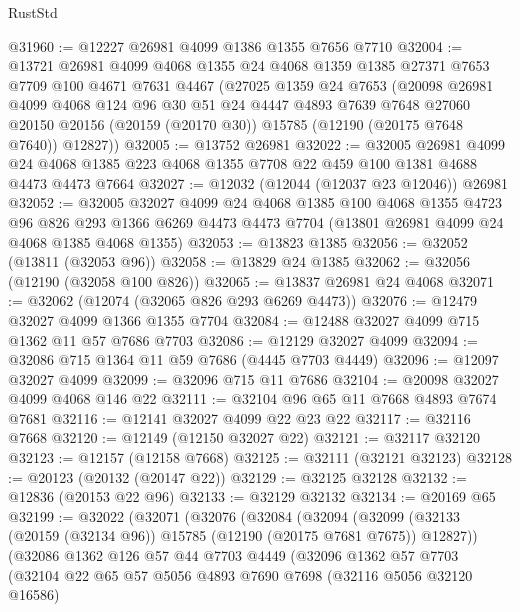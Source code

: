 \begin{lexlean}{RustStd}
\begin{coremodule}
@31960 := @12227 @26981 @4099 @1386 @1355 @7656 @7710
@32004 := @13721
    @26981
    @4099
    @4068
    @1355
    @24
    @4068
    @1359
    @1385
    @27371
    @7653
    @7709
    @100
    @4671
    @7631
    @4467
    (@27025
      @1359
      @24
      @7653
      (@20098
        @26981
        @4099
        @4068
        @124
        @96
        @30
        @51
        @24
        @4447
        @4893
        @7639
        @7648
        @27060
        @20150
        @20156
        (@20159 (@20170 @30))
        @15785
        (@12190 (@20175 @7648 @7640))
        @12827))
@32005 := @13752 @26981
@32022 := @32005
    @26981
    @4099
    @24
    @4068
    @1385
    @223
    @4068
    @1355
    @7708
    @22
    @459
    @100
    @1381
    @4688
    @4473
    @4473
    @7664
@32027 := @12032 (@12044 (@12037 @23 @12046)) @26981
@32052 := @32005
    @32027
    @4099
    @24
    @4068
    @1385
    @100
    @4068
    @1355
    @4723
    @96
    @826
    @293
    @1366
    @6269
    @4473
    @4473
    @7704
    (@13801 @26981 @4099 @24 @4068 @1385 @4068 @1355)
@32053 := @13823 @1385
@32056 := @32052 (@13811 (@32053 @96))
@32058 := @13829 @24 @1385
@32062 := @32056 (@12190 (@32058 @100 @826))
@32065 := @13837 @26981 @24 @4068
@32071 := @32062 (@12074 (@32065 @826 @293 @6269 @4473))
@32076 := @12479 @32027 @4099 @1366 @1355 @7704
@32084 := @12488 @32027 @4099 @715 @1362 @11 @57 @7686 @7703
@32086 := @12129 @32027 @4099
@32094 := @32086 @715 @1364 @11 @59 @7686 (@4445 @7703 @4449)
@32096 := @12097 @32027 @4099
@32099 := @32096 @715 @11 @7686
@32104 := @20098 @32027 @4099 @4068 @146 @22
@32111 := @32104 @96 @65 @11 @7668 @4893 @7674 @7681
@32116 := @12141 @32027 @4099 @22 @23 @22
@32117 := @32116 @7668
@32120 := @12149 (@12150 @32027 @22)
@32121 := @32117 @32120
@32123 := @12157 (@12158 @7668)
@32125 := @32111 (@32121 @32123)
@32128 := @20123 (@20132 (@20147 @22))
@32129 := @32125 @32128
@32132 := @12836 (@20153 @22 @96)
@32133 := @32129 @32132
@32134 := @20169 @65
@32199 := @32022
    (@32071
      (@32076
        (@32084
          (@32094
            (@32099 (@32133 (@20159 (@32134 @96)) @15785 (@12190 (@20175 @7681 @7675)) @12827))
            (@32086
              @1362
              @126
              @57
              @44
              @7703
              @4449
              (@32096
                @1362
                @57
                @7703
                (@32104
                  @22
                  @65
                  @57
                  @5056
                  @4893
                  @7690
                  @7698
                  (@32116 @5056 @32120 @16586)

\end{coremodule}
\end{lexlean}
